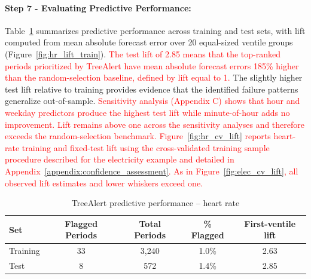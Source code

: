 \documentclass[]{interact}
\newcommand{\matt}[1]{\textcolor{red}{#1}}
\theoremstyle{definition}
\begin{document}
\paragraph*{Step 7 - Evaluating Predictive Performance:}
Table~\ref{tab:hr_performance} summarizes predictive performance across training and test sets, with lift computed from mean absolute forecast error over 20 equal-sized ventile groups (Figure~\ref{fig:hr_lift_train}). \matt{The test lift of 2.85 means that the top-ranked periods prioritized by TreeAlert have mean absolute forecast errors 185\% higher than the random-selection baseline, defined by lift equal to 1.} The slightly higher test lift relative to training provides evidence that the identified failure patterns generalize out-of-sample. \matt{Sensitivity analysis (Appendix C) shows that hour and weekday predictors produce the highest test lift while minute-of-hour adds no improvement. Lift remains above one across the sensitivity analyses and therefore exceeds the random-selection benchmark.}
\matt{Figure~\ref{fig:hr_cv_lift} reports heart-rate training and fixed-test lift using the cross-validated training sample procedure described for the electricity example and detailed in Appendix~\ref{appendix:confidence_assessment}. As in Figure~\ref{fig:elec_cv_lift}, all observed lift estimates and lower whiskers exceed one.}


\begin{table}
\centering
\caption{TreeAlert predictive performance -- heart rate}
\label{tab:hr_performance}
\small
\renewcommand{\arraystretch}{1.2}
\begin{tabular}{lcccc}
\toprule
\textbf{Set} & \textbf{Flagged Periods} & \textbf{Total Periods} & \textbf{\% Flagged} & \textbf{First-ventile lift} \\
\midrule
Training & 33 & 3,240 & 1.0\% & 2.63 \\
Test     & 8 & 572   & 1.4\% & 2.85 \\
\bottomrule
\end{tabular}
\end{table}
\end{document}
